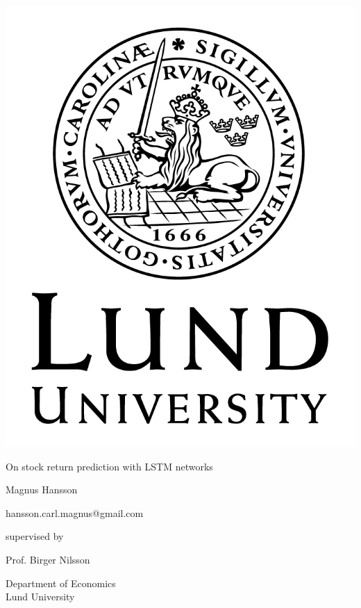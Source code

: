 \documentclass[12pt, letterpaper]{amsart}%
\begin{document}
\begin{titlepage}
\begin{center}

\centering 
\includegraphics[scale=0.2]{LundUniversity_C2line_BLACK.png}

\vspace{1cm}

\Large{On stock return prediction with LSTM networks}

\vspace{0.5cm}

\large{Magnus Hansson}

\small{hansson.carl.magnus@gmail.com}

\vspace{1cm}

supervised by\par 
Prof. Birger Nilsson

\vspace{1cm}

\small{Department of Economics}
\\
\small{Lund University}


\end{center}
\end{titlepage}
\end{document}
